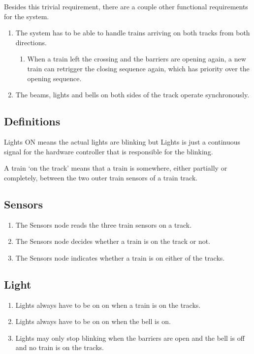 \documentclass[final]{report}
\begin{document}
Besides this trivial requirement, there are a couple other functional requirements for the system.

\begin{enumerate}
\item The system has to be able to handle trains arriving on both tracks from both directions.
	\begin{enumerate}
	\item When a train left the crossing and the barriers are opening again, a new train can retrigger the closing sequence again, which has priority over the opening sequence.
	\end{enumerate}

\item The beams, lights and bells on both sides of the track operate synchronously.
\end{enumerate}

\subsection{Definitions}
Lights ON means the actual lights are blinking but Lights is just a continuous signal for the hardware controller that is responsible for the blinking.

A train `on the track' means that a train is somewhere, either partially or completely, between the two outer train sensors of a train track.

\subsection{Sensors}
	\begin{enumerate}
		\item The Sensors node reads the three train sensors on a track.
		\item The Sensors node decides whether a train is on the track or not.
		\item The Sensors node indicates whether a train is on either of the tracks.
	\end{enumerate}

\subsection{Light}
	\begin{enumerate}
		\item Lights always have to be on on when a train is on the tracks.
		\item Lights always have to be on on when the bell is on.
		\item Lights may only stop blinking when the barriers are open and the bell is off and no train is on the tracks.
	\end{enumerate}
\end{document}
